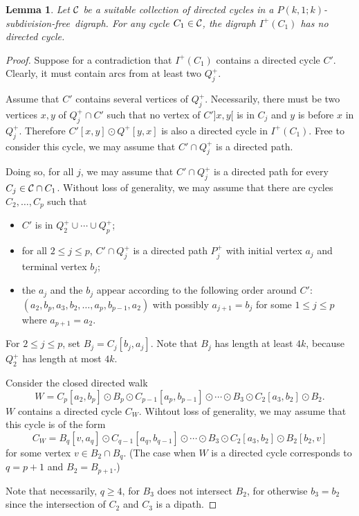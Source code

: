 \documentclass[utf8,10pt]{article}
\theoremstyle{plain}
\newtheorem{lemma}[theorem]{Lemma}
\theoremstyle{definition}
\theoremstyle{remark}
\newcommand{\free}{subdivision-free}
\begin{document}
\begin{lemma}\label{lem:no-dicycle}
Let ${\cal C}$ be a suitable collection of directed cycles in a $P(k,1;k)$-\free\ digraph. For any cycle $C_1\in {\cal C}$, the digraph
$I^+(C_1)$ has no directed cycle.  
\end{lemma}
\begin{proof}

Suppose for a contradiction that $I^+(C_1)$  contains a directed cycle $C'$.
Clearly, it must contain arcs from at least two $Q^+_j$.



Assume that $C'$ contains several vertices of $Q^+_j$.
Necessarily, there must be two vertices $x,y$ of $Q^+_j\cap C'$ such that no vertex of $C']x,y[$ is in $C_j$ and  $y$ is before $x$ in $Q^+_j$.
Therefore $C'[x,y]\odot Q^+[y,x]$ is also a directed cycle in $I^+(C_1)$. Free to consider this cycle,
we may assume that $C'\cap Q^+_j$ is a directed path.

Doing so, for all $j$, we may assume that $C'\cap Q^+_j$ is a directed path  for every $C_j\in {\cal C}\cap C_1$.
Without loss of generality, we may assume that there are cycles $C_2, \dots , C_p$ such that
\begin{itemize}
\item $C'$ is in $Q^+_2\cup \cdots  \cup Q^+_p$;
\item for all $2\leq j\leq p$, $C'\cap Q^+_j$ is a directed path $P^+_j$ with initial vertex $a_j$ and terminal vertex $b_j$;
\item the $a_j$ and the $b_j$ appear according to the following order around $C'$: $(a_2, b_p, a_3, b_2, \dots ,   a_p, b_{p-1}, a_2)$ with possibly $a_{j+1}=b_j$ for some $1\leq j \leq p$ where $a_{p+1}=a_2$.
\end{itemize}
For $2\leq j\leq p$, set $B_j=C_j[b_j, a_j]$. Note that $B_j$ has length at least $4k$, because $Q^+_2$ has length at most $4k$.


Consider the closed directed walk $$W=C_p[a_2,b_p]\odot B_p \odot C_{p-1}[a_p, b_{p-1}] \odot  \cdots  \odot  B_3\odot C_2[a_3, b_2]\odot B_2.$$
$W$ contains a directed cycle $C_W$. Wihtout loss of generality, we may assume that this cycle is of the form
$$C_W=B_q[v, a_q] \odot C_{q-1}[a_q, b_{q-1}] \odot  \cdots  \odot  B_3\odot C_2[a_3, b_2]\odot B_2[b_2, v]$$
for some vertex $v\in B_2\cap B_q$. (The case when $W$ is a directed cycle corresponds to $q=p+1$ and $B_2=B_{p+1}$.)

Note that necessarily, $q\geq 4$, for $B_3$ does not intersect $B_2$, for otherwise $b_3=b_2$ since the intersection of $C_2$ and $C_3$ is a dipath.


\end{proof}
\end{document}
